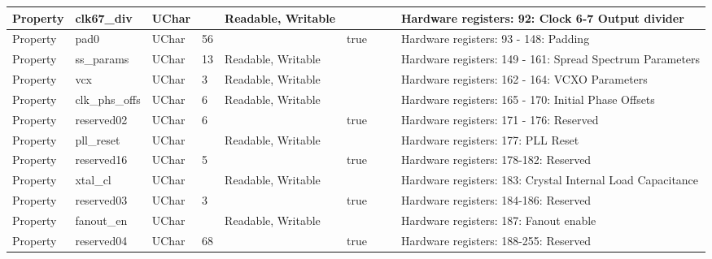 \begin{landscape}
\begin{scriptsize}
\begin{longtable}[l]{|p{2cm}|p{2cm}|p{1cm}|p{2cm}|p{1.7cm}|p{1cm}|p{2.5cm}|p{1cm}|p{5.88cm}|}
			\hline
      Property     & clk67\_div           & UChar &                 & Readable, Writable  &     &            &         & Hardware registers: 92: Clock 6-7 Output divider \\
			\hline
      Property     & pad0                 & UChar & 56              &                     & true&            &         & Hardware registers: 93 - 148: Padding \\
			\hline
      Property     & ss\_params           & UChar & 13              & Readable, Writable  &     &            &         & Hardware registers: 149 - 161: Spread Spectrum Parameters \\
			\hline
      Property     & vcx                  & UChar & 3               & Readable, Writable  &     &            &         & Hardware registers: 162 - 164: VCXO Parameters \\
			\hline
      Property     & clk\_phs\_offs       & UChar & 6               & Readable, Writable  &     &            &         & Hardware registers: 165 - 170: Initial Phase Offsets \\
			\hline
      Property     & reserved02           & UChar & 6               &                     & true&            &         & Hardware registers: 171 - 176: Reserved \\
			\hline
      Property     & pll\_reset           & UChar &                 & Readable, Writable  &     &            &         & Hardware registers: 177: PLL Reset \\
			\hline
      Property     & reserved16           & UChar & 5               &                     & true&            &         & Hardware registers: 178-182: Reserved \\
			\hline
      Property     & xtal\_cl             & UChar &                 & Readable, Writable  &     &            &         & Hardware registers: 183: Crystal Internal Load Capacitance \\
			\hline
      Property     & reserved03           & UChar & 3               &                     & true&            &         & Hardware registers: 184-186: Reserved \\
			\hline
      Property     & fanout\_en           & UChar &                 & Readable, Writable  &     &            &         & Hardware registers: 187: Fanout enable \\
			\hline
      Property     & reserved04           & UChar & 68              &                     & true&            &         & Hardware registers: 188-255: Reserved \\
			\hline
		\end{longtable}



\end{scriptsize}
\end{landscape}
